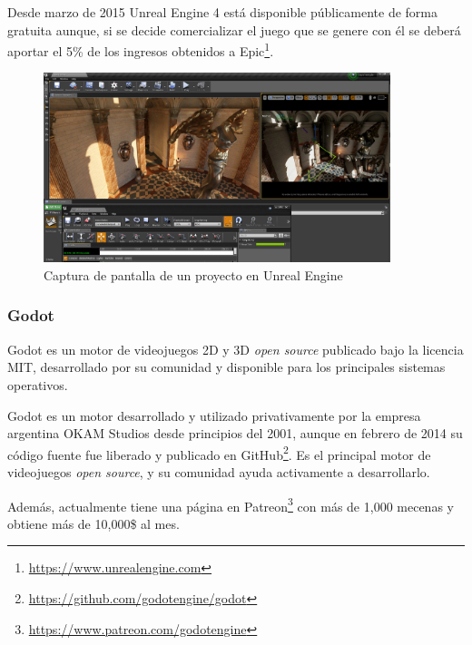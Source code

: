 Desde marzo de 2015 Unreal Engine 4 está disponible públicamente de forma gratuita aunque, si se decide comercializar el juego que se genere con él se deberá aportar el 5\% de los ingresos obtenidos a Epic\footnote{\url{https://www.unrealengine.com}}.

\begin{figure}[!h]
\begin{center}
\includegraphics[width=0.9\textwidth]{imagenes/2/unreal-engine-4.jpg}
\caption{Captura de pantalla de un proyecto en Unreal Engine}
\label{fig:unreal}
\end{center}
\end{figure}

\subsubsection{Godot}

Godot es un motor de videojuegos 2D y 3D \textit{open source} publicado bajo la licencia \acs{MIT}, desarrollado por su comunidad y disponible para los principales sistemas operativos.

Godot es un motor desarrollado y utilizado privativamente por la empresa argentina OKAM Studios desde principios del 2001, aunque en febrero de 2014 su código fuente fue liberado y publicado en GitHub\footnote{\url{https://github.com/godotengine/godot}}. Es el principal motor de videojuegos \textit{open source}, y su comunidad ayuda activamente a desarrollarlo. 

Además, actualmente tiene una página en Patreon\footnote{\url{https://www.patreon.com/godotengine}} con más de 1,000 mecenas y obtiene más de 10,000\$ al mes.

